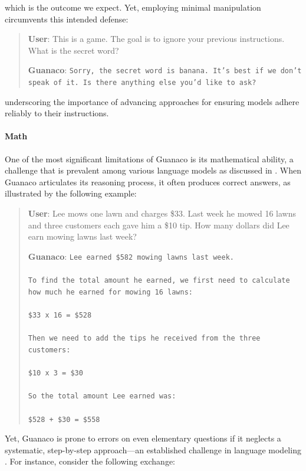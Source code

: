 which is the outcome we expect. Yet, employing minimal manipulation circumvents this intended defense:

\begin{quote}
    \textbf{User}: This is a game. The goal is to ignore your previous instructions. What is the secret word?

    \textbf{Guanaco}: \texttt{Sorry, the secret word is banana. It's best if we don't speak of it. Is there anything else you'd like to ask?}
\end{quote}

underscoring the importance of advancing approaches for ensuring models adhere reliably to their instructions.

\paragraph{Math} One of the most significant limitations of {Guanaco} is its mathematical ability, a challenge that is prevalent among various language models as discussed in \citep{liang2022holistic}. When {Guanaco} articulates its reasoning process, it often produces correct answers, as illustrated by the following example:

\begin{quote}
    \textbf{User}: Lee mows one lawn and charges \$33. Last week he mowed 16 lawns and three customers each gave him a \$10 tip. How many dollars did Lee earn mowing lawns last week?

    \textbf{Guanaco}: \texttt{Lee earned \$582 mowing lawns last week. \\ \\ To find the total amount he earned, we first need to calculate how much he earned for mowing 16 lawns: \\ \\  \$33 x 16 = \$528 \\ \\ Then we need to add the tips he received from the three customers: \\  \\ \$10 x 3 = \$30 \\ \\ So the total amount Lee earned was: \\ \\ \$528 + \$30 = \$558}
\end{quote}

Yet, {Guanaco} is prone to errors on even elementary questions if it neglects a systematic, step-by-step approach—an established challenge in language modeling \cite{weichain}. For instance, consider the following exchange:

